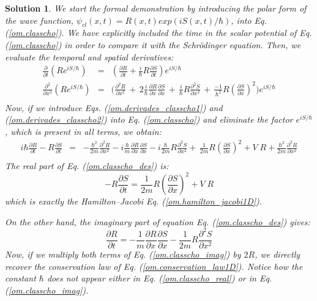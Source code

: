 \documentclass[nofootinbib, secnumarabic, amsmath, nobibnotes,11pt,aps,pra, floatfix]{revtex4-1}
\newtheorem{solution}{Solution}
\newcommand{\eref}[1]{Eq. (\ref{#1})}
\begin{document}
\begin{solution}
We start the formal demonstration by introducing the polar form of the wave function, $\psi_{cl}(x,t) = R(x,t) exp(i S(x,t)/\hbar)$, into \eref{om.classcho}. We have explicitly included the time in the scalar potential of \eref{om.classcho} in order to compare it with the Schr\"odinger equation. Then, we evaluate the temporal and spatial derivatives:
\begin{eqnarray}
\label{om.derivades_classcho1}
\frac {\partial} {\partial t} \left(Re^{i S/\hbar}\right)& = &\left( \frac {\partial R} {\partial t} + \frac {i} {\hbar} R\frac{\partial S} {\partial t} \right)e^{i S/\hbar}\\
\label{om.derivades_classcho2}
\frac {\partial^2} {\partial x^2} \left(Re^{i S/\hbar}\right) & = &\!\Bigg( \frac {\partial^2 R} {\partial x^2} \,{+}\, 2 \frac {i} {\hbar} \frac{\partial R} {\partial x} \frac{\partial S} {\partial x} \,{+}\, \frac {i} {\hbar} R \frac{\partial^2 S} {\partial x^2} \,{+}\, \frac {-1} {\hbar^2} R \left( \frac{\partial S} {\partial x}\right)^2\! \Bigg) e^{i S/\hbar}\nonumber\\
\end{eqnarray}
Now, if we introduce Eqs. (\ref{om.derivades_classcho1}) and
(\ref{om.derivades_classcho2}) into \eref{om.classcho} and
eliminate the factor $e^{i S/\hbar}$, which is present in all terms,
we obtain:
\begin{eqnarray}
\label{om.classcho_des}
i \hbar \frac {\partial R} {\partial t} - R\frac{\partial S}
{\partial t} &=& -\frac {\hbar^2}{2m} \frac {\partial^2 R} {\partial
x^2} - i\frac {\hbar}{m} \frac{\partial R} {\partial x}
\frac{\partial S} {\partial x} - i \frac {\hbar}{2m} R
\frac{\partial^2 S} {\partial x^2} +\, \frac {1} {2m} R \left(
\frac{\partial S} {\partial x}\right)^2+ V \; R + \frac {\hbar^{2}} {2 m} \frac { {\partial}^2 R} {\partial x^2}\nonumber\\
\end{eqnarray}
The real part of \eref{om.classcho_des} is:
\begin{equation}
\label{om.classcho_real}
 -R\frac{\partial S} {\partial t} = \frac {1} {2m} R \left( \frac{\partial S} {\partial x}\right)^2 + V \; R
\end{equation}
which is exactly the Hamilton--Jacobi \eref{om.hamilton_jacobi1D}. 

On the other hand, the imaginary part of equation \eref{om.classcho_des} gives:
\begin{equation}	
\label{om.classcho_imag}
 \frac {\partial R} {\partial t} = -\frac {1}{m} \frac{\partial R} {\partial x} \frac{\partial S} {\partial x} - \frac {1}{2m} R \frac{\partial^2 S} {\partial x^2}
\end{equation}
Now, if we multiply both terms of \eref{om.classcho_imag} by $2 R$,
we directly recover the conservation law of
\eref{om.conservation_law1D}. Notice how the constant $\hbar$ does
not appear either in \eref{om.classcho_real} or in
\eref{om.classcho_imag}.
\end{solution}
\end{document}
